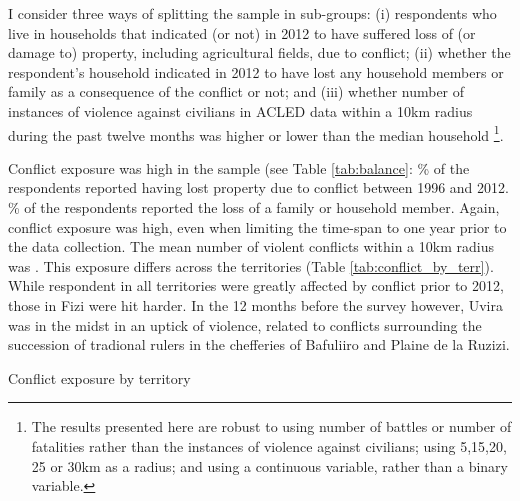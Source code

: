\documentclass[10pt,a4paper,abstract=on]{scrartcl} %
\newcommand{\tableloc}{C:/Users/Koen/Dropbox/PhD/Papers/CongoGBV/Tables}
\begin{document}
I consider three ways of splitting the sample in sub-groups: (i) respondents who live in households that indicated (or not) in 2012 to have suffered loss of (or damage to) property, including agricultural fields, due to conflict; (ii) whether the respondent's household indicated in 2012 to have lost any household members or family as a consequence of the conflict or not; and (iii) whether number of instances of violence against civilians in ACLED data within a 10km radius during the past twelve months was higher or lower than the median household \footnote{The results presented here are robust to using number of battles or number of fatalities rather than the instances of violence against civilians; using 5,15,20, 25 or 30km as a radius; and using a continuous variable, rather than a binary variable.}. 

Conflict exposure was high in the sample (see Table \ref{tab:balance}: \% of the respondents reported having lost property due to conflict between 1996 and 2012.  \% of the respondents reported the loss of a family or household member. Again, conflict exposure was high, even when limiting the time-span to one year prior to the data collection. The mean number of violent conflicts within a 10km radius was . This exposure differs across the territories (Table \ref{tab:conflict_by_terr}). While respondent in all territories were greatly affected by conflict prior to 2012, those in Fizi were hit harder. In the 12 months before the survey however, Uvira was in the midst in an uptick of violence, related to conflicts surrounding the succession of tradional rulers in the chefferies of Bafuliiro and Plaine de la Ruzizi.

\begin{table}[htb]
\centering
\caption{Conflict exposure by territory }
\label{tab:conflict_by_terr}

\end{table}
\end{document}
